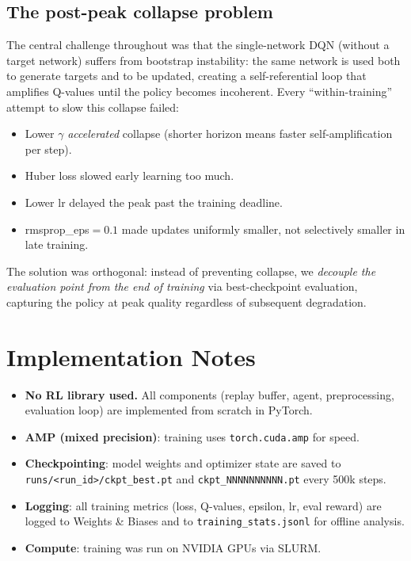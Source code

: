 \documentclass[11pt,a4paper]{article}
\begin{document}
\subsection{The post-peak collapse problem}
The central challenge throughout was that the single-network DQN (without a target network)
suffers from bootstrap instability: the same network is used both to generate targets and
to be updated, creating a self-referential loop that amplifies Q-values until the policy
becomes incoherent. Every ``within-training'' attempt to slow this collapse failed:
\begin{itemize}
  \item Lower $\gamma$ \emph{accelerated} collapse (shorter horizon means faster
        self-amplification per step).
  \item Huber loss slowed early learning too much.
  \item Lower lr delayed the peak past the training deadline.
  \item rmsprop\_eps$=0.1$ made updates uniformly smaller, not selectively smaller in late
        training.
\end{itemize}
The solution was orthogonal: instead of preventing collapse, we \emph{decouple the
evaluation point from the end of training} via best-checkpoint evaluation, capturing the
policy at peak quality regardless of subsequent degradation.

\section{Implementation Notes}

\begin{itemize}
  \item \textbf{No RL library used.} All components (replay buffer, agent, preprocessing,
        evaluation loop) are implemented from scratch in PyTorch.
  \item \textbf{AMP (mixed precision)}: training uses \texttt{torch.cuda.amp} for speed.
  \item \textbf{Checkpointing}: model weights and optimizer state are saved to
        \texttt{runs/<run\_id>/ckpt\_best.pt} and \texttt{ckpt\_NNNNNNNNNN.pt} every 500k steps.
  \item \textbf{Logging}: all training metrics (loss, Q-values, epsilon, lr, eval reward)
        are logged to Weights \& Biases and to \texttt{training\_stats.jsonl} for
        offline analysis.
  \item \textbf{Compute}: training was run on NVIDIA GPUs via SLURM.
\end{itemize}
\end{document}
